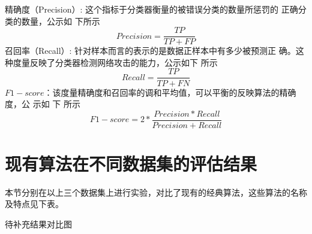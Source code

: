 精确度（Precision）: 这个指标于分类器衡量的被错误分类的数量所惩罚的
正确分类的数量，公示如 下所示
\begin{equation}
    Precision = \frac{TP}{TP + FP}
\end{equation}
召回率（Recall）: 针对样本而言的表示的是数据正样本中有多少被预测正
确。这种度量反映了分类器检测网络攻击的能力，公示如下  所示
\begin{equation}
    Recall = \frac{TP}{TP+ FN}
\end{equation}
$F1-score$：该度量精确度和召回率的调和平均值，可以平衡的反映算法的精确度，公
示如 下 所示
\begin{equation}
    F1-score = 2*\frac{Precision * Recall}{Precision + Recall}
\end{equation}

\section{现有算法在不同数据集的评估结果}
本节分别在以上三个数据集上进行实验，对比了现有的经典算法，这些算法的名称及特点见下表。

待补充结果对比图
